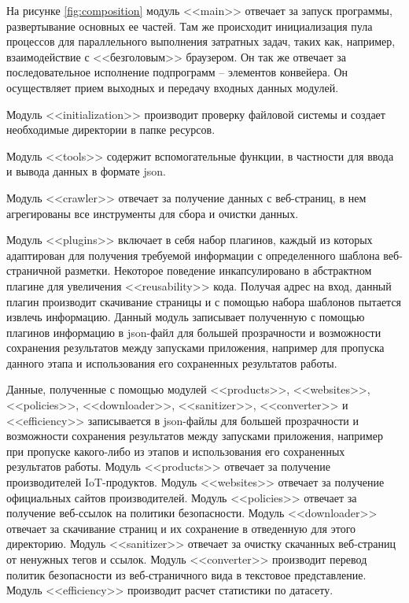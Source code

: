 \documentclass[../main]{subfiles}
\begin{document}
На рисунке \ref{fig:composition} модуль <<main>> отвечает за запуск программы, развертывание основных ее частей. Там же происходит инициализация пула процессов для параллельного выполнения затратных задач, таких как, например, взаимодействие с <<безголовым>> браузером. Он так же отвечает за последовательное исполнение подпрограмм -- элементов конвейера. Он осуществляет прием выходных и передачу входных данных модулей.

Модуль <<initialization>> производит проверку файловой системы и создает необходимые директории в папке ресурсов.

Модуль <<tools>> содержит вспомогательные функции, в частности для ввода и вывода данных в формате json. 

Модуль <<crawler>> отвечает за получение данных с веб-страниц, в нем агрегированы все инструменты для сбора и очистки данных. 

Модуль <<plugins>> включает в себя набор плагинов, каждый из которых адаптирован для получения требуемой информации с определенного шаблона веб-страничной разметки. Некоторое поведение инкапсулировано в абстрактном плагине для увеличения <<reusability>> кода. Получая адрес на вход, данный плагин производит скачивание страницы и с помощью набора шаблонов пытается извлечь информацию. Данный модуль записывает полученную с помощью плагинов информацию в json-файл для большей прозрачности и возможности сохранения результатов между запусками приложения, например для пропуска данного этапа и использования его сохраненных результатов работы. 

Данные, полученные с помощью модулей <<products>>, <<websites>>, <<policies>>, <<downloader>>, <<sanitizer>>, <<converter>> и <<efficiency>> записывается в json-файлы для большей прозрачности и возможности сохранения результатов между запусками приложения, например при пропуске какого-либо из этапов и использования его сохраненных результатов работы. Модуль <<products>> отвечает за получение производителей IoT-продуктов. Модуль <<websites>> отвечает за получение официальных сайтов производителей. Модуль <<policies>> отвечает за получение веб-ссылок на политики безопасности. Модуль <<downloader>> отвечает за скачивание страниц и их сохранение в отведенную для этого директорию. Модуль <<sanitizer>> отвечает за очистку скачанных веб-страниц от ненужных тегов и ссылок. Модуль <<converter>> производит перевод политик безопасности из веб-страничного вида в текстовое представление. Модуль <<efficiency>> производит расчет статистики по датасету.
\end{document}
